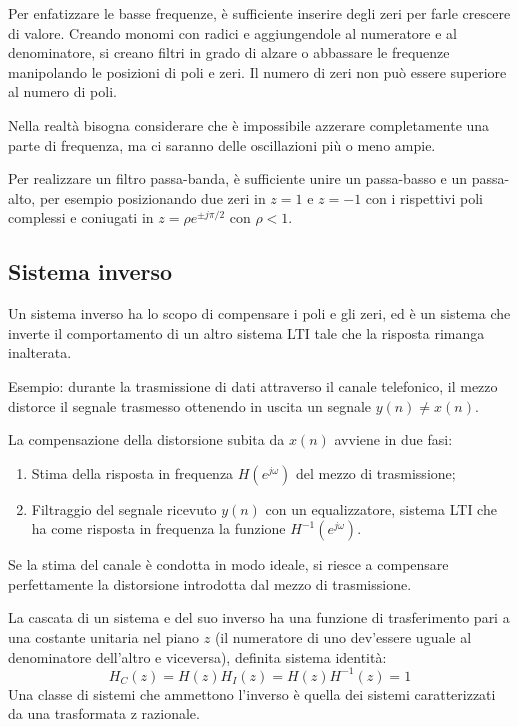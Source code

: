 Per enfatizzare le basse frequenze, è sufficiente inserire degli zeri per farle crescere di valore. Creando monomi con radici e aggiungendole al numeratore e al denominatore, si creano filtri in grado di alzare o abbassare le frequenze manipolando le posizioni di poli e zeri. Il numero di zeri non può essere superiore al numero di poli.

Nella realtà bisogna considerare che è impossibile azzerare completamente una parte di frequenza, ma ci saranno delle oscillazioni più o meno ampie.

Per realizzare un filtro passa-banda, è sufficiente unire un passa-basso e un passa-alto, per esempio posizionando due zeri in $z = 1$ e $z = -1$ con i rispettivi poli complessi e coniugati in $z = \rho e^{\pm j\pi/2}$ con $\rho < 1$.

\subsection{Sistema inverso}
Un sistema inverso ha lo scopo di compensare i poli e gli zeri, ed è un sistema che inverte il comportamento di un altro sistema LTI tale che la risposta rimanga inalterata.

Esempio: durante la trasmissione di dati attraverso il canale telefonico, il mezzo distorce il segnale trasmesso ottenendo in uscita un segnale $y(n) \neq x(n)$.

La compensazione della distorsione subita da $x(n)$ avviene in due fasi:
\begin{enumerate}
	\item Stima della risposta in frequenza $H(e^{j\omega})$ del mezzo di trasmissione;
	\item Filtraggio del segnale ricevuto $y(n)$ con un equalizzatore, sistema LTI che ha come risposta in frequenza la funzione $H^{-1}(e^{j\omega})$.
\end{enumerate}

Se la stima del canale è condotta in modo ideale, si riesce a compensare perfettamente la distorsione introdotta dal mezzo di trasmissione.

La cascata di un sistema e del suo inverso ha una funzione di trasferimento pari a una costante unitaria nel piano $z$ (il numeratore di uno dev'essere uguale al denominatore dell'altro e viceversa), definita sistema identità:
$$H_C(z) = H(z)H_I(z) = H(z)H^{-1}(z) = 1$$
Una classe di sistemi che ammettono l'inverso è quella dei sistemi caratterizzati da una trasformata z razionale.


